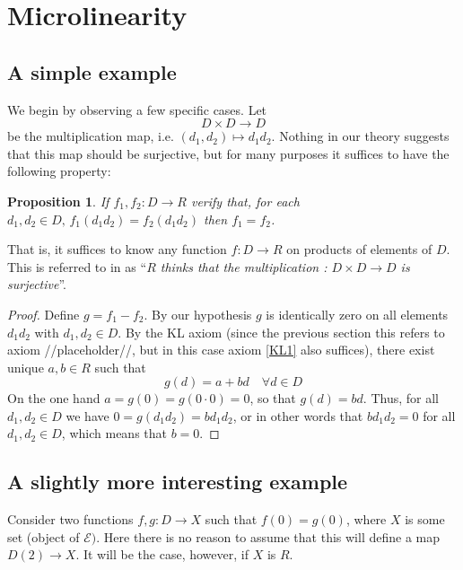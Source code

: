 \documentclass[11pt]{article}
\newtheorem{proposition}{Proposition}[section]
\theoremstyle{definition}
\newcommand{\sdgE}{\mathcal{E}}
\numberwithin{equation}{section}
\begin{document}
\section{Microlinearity}

\subsection{A simple example}

We begin by observing a few specific cases. Let
\begin{equation*}
   D\times D \to D 
\end{equation*}
be the multiplication map, i.e. \( (d_1,d_2)\mapsto d_1d_2 \). Nothing in our theory suggests that this map should be surjective, but for many purposes it suffices to have the following property:

\begin{proposition}
  If \( f_1,f_2:D \to R \) verify that, for each \( d_1,d_2\in D,\, f_1(d_1d_2) = f_2(d_1d_2)  \) then \( f_1=f_2 \).
\end{proposition}

That is, it suffices to know any function \( f:D\to R \) on products of elements of \( D \). This is referred to in \cite{kock06} as ``\emph{\( R \) thinks that the multiplication : \( D\times D\to D \) is surjective}''.

\begin{proof}
  Define \( g = f_1-f_2 \). By our hypothesis \( g \) is identically zero on all elements \( d_1d_2 \) with \( d_1,d_2\in D \). By the KL axiom (since the previous section this refers to axiom {//placeholder//}, but in this case axiom \ref{KL1} also suffices), there exist unique \( a,b\in R \) such that
  \begin{equation*}
    g(d)=a + bd\quad \forall d\in D 
  \end{equation*}
  On the one hand \( a=g(0)=g(0\cdot 0) = 0 \), so that \( g(d)=bd \). Thus, for all \( d_1,d_2\in D \) we have \( 0 = g(d_1d_2) = bd_1d_2 \), or in other words that \( bd_1d_2=0 \) for all \( d_1,d_2\in D \), which means that \( b=0 \).
\end{proof}

\subsection{A slightly more interesting example}

Consider two functions \( f,g:D\to X \) such that \( f(0)=g(0) \), where \( X \) is some set (object of \(  \sdgE) \). Here there is no reason to assume that this will define a map \( D(2)\to X \). It will be the case, however, if \( X \) is \( R \).
\end{document}
